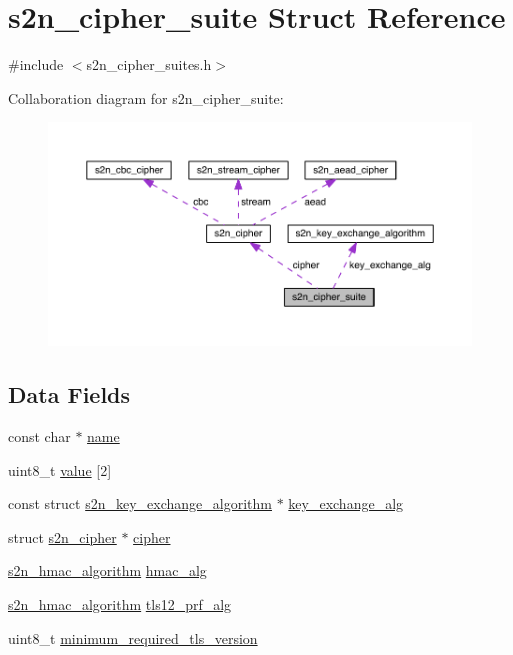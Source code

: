 \hypertarget{structs2n__cipher__suite}{}\section{s2n\+\_\+cipher\+\_\+suite Struct Reference}
\label{structs2n__cipher__suite}


{\ttfamily \#include $<$s2n\+\_\+cipher\+\_\+suites.\+h$>$}



Collaboration diagram for s2n\+\_\+cipher\+\_\+suite\+:\nopagebreak
\begin{figure}[H]
\begin{center}
\leavevmode
\includegraphics[width=350pt]{structs2n__cipher__suite__coll__graph}
\end{center}
\end{figure}
\subsection*{Data Fields}
\begin{DoxyCompactItemize}
\item 
const char $\ast$ \hyperlink{structs2n__cipher__suite_a8f8f80d37794cde9472343e4487ba3eb}{name}
\item 
uint8\+\_\+t \hyperlink{structs2n__cipher__suite_a9b3a865c19b6bc5b1d68ff63ed97b6c5}{value} \mbox{[}2\mbox{]}
\item 
const struct \hyperlink{structs2n__key__exchange__algorithm}{s2n\+\_\+key\+\_\+exchange\+\_\+algorithm} $\ast$ \hyperlink{structs2n__cipher__suite_aaf88ce0be23d983d21bbbecfce1c293d}{key\+\_\+exchange\+\_\+alg}
\item 
struct \hyperlink{structs2n__cipher}{s2n\+\_\+cipher} $\ast$ \hyperlink{structs2n__cipher__suite_aa0d5d8173f0d8ab4afc0c6524078d6e3}{cipher}
\item 
\hyperlink{s2n__hmac_8h_a05e34c658a0066b52f746b931d53dbf8}{s2n\+\_\+hmac\+\_\+algorithm} \hyperlink{structs2n__cipher__suite_a90bc81bf7297c0cc02ecd7b52e436b5e}{hmac\+\_\+alg}
\item 
\hyperlink{s2n__hmac_8h_a05e34c658a0066b52f746b931d53dbf8}{s2n\+\_\+hmac\+\_\+algorithm} \hyperlink{structs2n__cipher__suite_a603b265af83e10e06d5ec17614a68d12}{tls12\+\_\+prf\+\_\+alg}
\item 
uint8\+\_\+t \hyperlink{structs2n__cipher__suite_a5ab3744bc363b23e4a905125862c375a}{minimum\+\_\+required\+\_\+tls\+\_\+version}
\end{DoxyCompactItemize}


